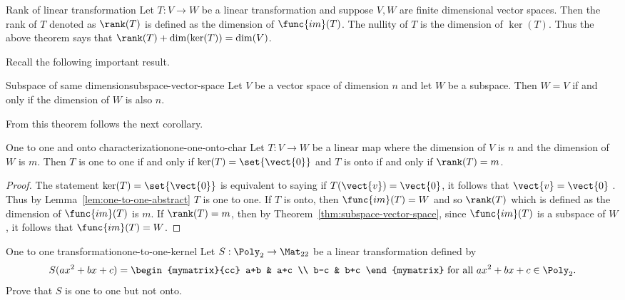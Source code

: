 \begin{definition}{Rank of linear transformation}{}
Let $T:V\rightarrow W$ be a linear transformation and suppose $V,W$ are finite dimensional vector spaces. Then
the rank of $T$ denoted as $\rank(T) $ is defined as the
dimension of $\func{im}(T)$. The nullity of $T$ is the
dimension of $\ker (T)$. Thus the above theorem says that $
\rank(T) +\dim (\ker (T)) =\dim
(V)$.
\end{definition}

Recall the following important result. 

\begin{theorem}{Subspace of same dimension}{subspace-vector-space}
Let $V$ be a vector space of dimension $n$ and let $W$ be a
subspace. Then $W=V$ if and only if the dimension of $W$ is also $n$.
\end{theorem}

From this theorem follows the next corollary.

\begin{corollary}{One to one and onto characterization}{one-one-onto-char}
Let $T:V\rightarrow W$ be a linear map where the dimension of $V$ is $n$ and
the dimension of $W$ is $m$. Then $T$ is one to one if and only if $\ker
(T) =\set{\vect{0}} $ and $T$ is onto if and only if $
\rank(T) =m$.
\end{corollary}

\begin{proof}
The statement $\ker (T) =\set{\vect{0}} $
is equivalent to saying if $T (\vect{v})=\vect{0}$, it follows that $\vect{v}=\vect{0}$
. Thus by Lemma~\ref{lem:one-to-one-abstract} $T$ is one to one. If $T$ is onto, then $
\func{im}(T) =W$ and so $\rank(T) $ which is
defined as the dimension of $\func{im}(T) $ is $m$. If $\rank(T) =m$, then by Theorem~\ref{thm:subspace-vector-space}, since $\func{im}
(T) $ is a subspace of $W$, it follows that $\func{im}(
T) =W$. 
\end{proof}

\begin{example}{One to one transformation}{one-to-one-kernel}
Let $S:\Poly_2\to\Mat_{22}$ be a linear transformation
defined by
\[ S(ax^2+bx+c)
=
\begin{mymatrix}{cc}
a+b & a+c \\ b-c & b+c \end{mymatrix}
\mbox{ for all }
 ax^2+bx+c\in \Poly_2.\]
Prove that $S$ is one to one but not onto.
\end{example}

